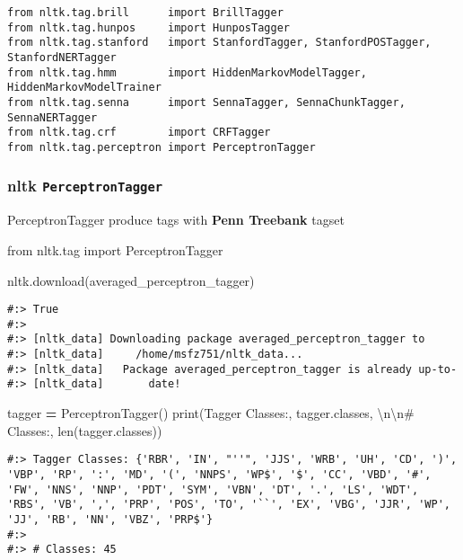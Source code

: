 \documentclass[
]{book}
\newenvironment{Shaded}{\begin{snugshade}}{\end{snugshade}}
\newcommand{\BuiltInTok}[1]{#1}
\newcommand{\CharTok}[1]{\textcolor[rgb]{0.5,0.5,0.5}{#1}}
\newcommand{\ImportTok}[1]{#1}
\newcommand{\NormalTok}[1]{#1}
\newcommand{\OperatorTok}[1]{\textcolor[rgb]{0.43,0.43,0.43}{\textbf{#1}}}
\newcommand{\StringTok}[1]{\textcolor[rgb]{0.5,0.5,0.5}{#1}}
\begin{document}
\begin{verbatim}
from nltk.tag.brill      import BrillTagger
from nltk.tag.hunpos     import HunposTagger
from nltk.tag.stanford   import StanfordTagger, StanfordPOSTagger, StanfordNERTagger
from nltk.tag.hmm        import HiddenMarkovModelTagger, HiddenMarkovModelTrainer
from nltk.tag.senna      import SennaTagger, SennaChunkTagger, SennaNERTagger
from nltk.tag.crf        import CRFTagger
from nltk.tag.perceptron import PerceptronTagger
\end{verbatim}

\hypertarget{nltk-perceptrontagger}{%
\subsubsection{\texorpdfstring{nltk \texttt{PerceptronTagger}}{nltk PerceptronTagger}}\label{nltk-perceptrontagger}}

PerceptronTagger produce tags with \textbf{Penn Treebank} tagset

\begin{Shaded}
\begin{Highlighting}[]
\ImportTok{from}\NormalTok{ nltk.tag }\ImportTok{import}\NormalTok{ PerceptronTagger}

\NormalTok{nltk.download(}\StringTok{\textquotesingle{}averaged\_perceptron\_tagger\textquotesingle{}}\NormalTok{)}
\end{Highlighting}
\end{Shaded}

\begin{verbatim}
#:> True
#:> 
#:> [nltk_data] Downloading package averaged_perceptron_tagger to
#:> [nltk_data]     /home/msfz751/nltk_data...
#:> [nltk_data]   Package averaged_perceptron_tagger is already up-to-
#:> [nltk_data]       date!
\end{verbatim}

\begin{Shaded}
\begin{Highlighting}[]
\NormalTok{tagger }\OperatorTok{=}\NormalTok{ PerceptronTagger()}
\BuiltInTok{print}\NormalTok{(}\StringTok{\textquotesingle{}Tagger Classes:\textquotesingle{}}\NormalTok{, tagger.classes, }
      \StringTok{\textquotesingle{}}\CharTok{\textbackslash{}n\textbackslash{}n}\StringTok{\# Classes:\textquotesingle{}}\NormalTok{, }\BuiltInTok{len}\NormalTok{(tagger.classes))}
\end{Highlighting}
\end{Shaded}

\begin{verbatim}
#:> Tagger Classes: {'RBR', 'IN', "''", 'JJS', 'WRB', 'UH', 'CD', ')', 'VBP', 'RP', ':', 'MD', '(', 'NNPS', 'WP$', '$', 'CC', 'VBD', '#', 'FW', 'NNS', 'NNP', 'PDT', 'SYM', 'VBN', 'DT', '.', 'LS', 'WDT', 'RBS', 'VB', ',', 'PRP', 'POS', 'TO', '``', 'EX', 'VBG', 'JJR', 'WP', 'JJ', 'RB', 'NN', 'VBZ', 'PRP$'} 
#:> 
#:> # Classes: 45
\end{verbatim}
\end{document}
